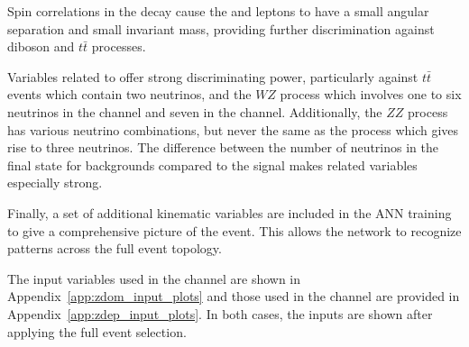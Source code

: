 Spin correlations in the \hww{} decay cause the \lzero{} and \lone{} leptons to have a small angular separation and small invariant mass, providing further discrimination against diboson and $t\bar{t}$ processes.

Variables related to \met{} offer strong discriminating power, particularly against $t\bar{t}$ events which contain two neutrinos, and the $WZ$ process which involves one to six neutrinos in the \zdom{} channel and seven in the \zdep{} channel. Additionally, the $ZZ$ process has various neutrino combinations, but never the same as the \wh{} process which gives rise to three neutrinos. The difference between the number of neutrinos in the final state for backgrounds compared to the signal makes \met{} related variables especially strong.

Finally, a set of additional kinematic variables are included in the ANN training to give a comprehensive picture of the event. This allows the network to recognize patterns across the full event topology.

The input variables used in the \zdom{} channel are shown in Appendix~\ref{app:zdom_input_plots} and those used in the \zdep{} channel are provided in Appendix~\ref{app:zdep_input_plots}. In both cases, the inputs are shown after applying the full event selection.